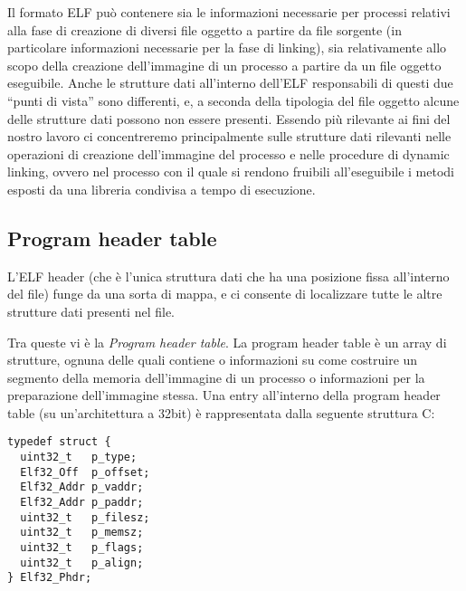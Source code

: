 Il formato ELF può contenere sia le informazioni necessarie per
processi relativi alla fase di creazione di diversi file oggetto a
partire da file sorgente (in particolare informazioni necessarie per
la fase di linking), sia relativamente allo scopo della creazione
dell'immagine di un processo a partire da un file oggetto
eseguibile. Anche le strutture dati all'interno dell'ELF responsabili
di questi due ``punti di vista'' sono differenti, e, a seconda della
tipologia del file oggetto alcune delle strutture dati possono non
essere presenti. Essendo più rilevante ai fini del nostro lavoro ci
concentreremo principalmente sulle strutture dati rilevanti nelle
operazioni di creazione dell'immagine del processo e nelle procedure
di dynamic linking, ovvero nel processo con il quale si rendono
fruibili all'eseguibile i metodi esposti da una libreria condivisa a
tempo di esecuzione.

\subsection{Program header table}

L'ELF header (che è l'unica struttura dati che ha una posizione fissa
all'interno del file) funge da una sorta di mappa, e ci consente di
localizzare tutte le altre strutture dati presenti nel file.

Tra queste vi è la \emph{Program header table}. La program header
table è un array di strutture, ognuna delle quali contiene o
informazioni su come costruire un segmento della memoria dell'immagine
di un processo o informazioni per la preparazione dell'immagine
stessa. Una entry all'interno della program header table (su
un'architettura a 32bit) è rappresentata dalla seguente struttura C:

\begin{lstlisting}[caption=program header table entry]
typedef struct {
  uint32_t   p_type;
  Elf32_Off  p_offset;
  Elf32_Addr p_vaddr;
  Elf32_Addr p_paddr;
  uint32_t   p_filesz;
  uint32_t   p_memsz;
  uint32_t   p_flags;
  uint32_t   p_align;
} Elf32_Phdr;
\end{lstlisting}

